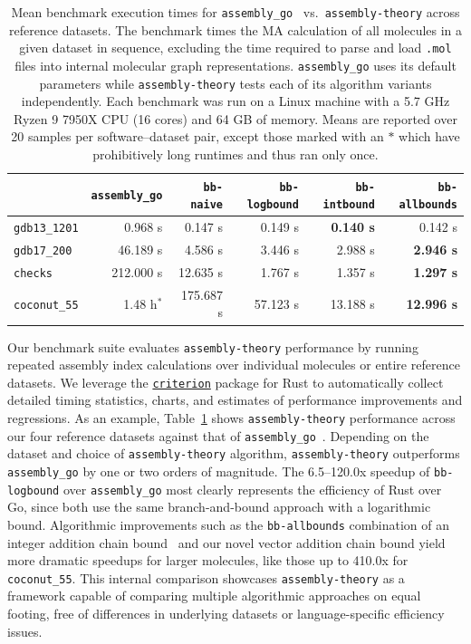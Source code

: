 \documentclass[acmsmall,nonacm,screen]{acmart}  %
\begin{document}
\begin{table}[tbh]
    \centering
    \caption{Mean benchmark execution times for \texttt{assembly\_go}~\cite{Jirasek2024-investigatingquantifying} vs.\ \texttt{assembly-theory} across reference datasets.
    The benchmark times the MA calculation of all molecules in a given dataset in sequence, excluding the time required to parse and load \texttt{.mol} files into internal molecular graph representations.
    \texttt{assembly\_go} uses its default parameters while \texttt{assembly-theory} tests each of its algorithm variants independently.
    Each benchmark was run on a Linux machine with a 5.7 GHz Ryzen 9 7950X CPU (16 cores) and 64 GB of memory.
    Means are reported over 20 samples per software--dataset pair, except those marked with an $\ast$ which have prohibitively long runtimes and thus ran only once.}
    \label{tab:benchtimes}
    \begin{tabular}{lrrrrr}
        \toprule
         & \texttt{assembly\_go} & \texttt{bb-naive} & \texttt{bb-logbound} & \texttt{bb-intbound} & \texttt{bb-allbounds} \\
        \midrule
        \texttt{gdb13\_1201} & 0.968 s & 0.147 s & 0.149 s & \textbf{0.140 s} & 0.142 s \\
        \texttt{gdb17\_200} & 46.189 s & 4.586 s & 3.446 s & 2.988 s & \textbf{2.946 s} \\
        \texttt{checks} & 212.000 s & 12.635 s & 1.767 s & 1.357 s & \textbf{1.297 s} \\
        \texttt{coconut\_55} & 1.48 h$^\ast$ & 175.687 s & 57.123 s & 13.188 s & \textbf{12.996 s} \\
        \bottomrule
    \end{tabular}
\end{table}

Our benchmark suite evaluates \texttt{assembly-theory} performance by running repeated assembly index calculations over individual molecules or entire reference datasets.
We leverage the \href{https://bheisler.github.io/criterion.rs/criterion/}{\texttt{criterion}} package for Rust to automatically collect detailed timing statistics, charts, and estimates of performance improvements and regressions.
As an example, Table~\ref{tab:benchtimes} shows \texttt{assembly-theory} performance across our four reference datasets against that of \texttt{assembly\_go}~\cite{Jirasek2024-investigatingquantifying}.
Depending on the dataset and choice of \texttt{assembly-theory} algorithm, \texttt{assembly-theory} outperforms \texttt{assembly\_go} by one or two orders of magnitude.
The 6.5--120.0x speedup of \texttt{bb-logbound} over \texttt{assembly\_go} most clearly represents the efficiency of Rust over Go, since both use the same branch-and-bound approach with a logarithmic bound.
Algorithmic improvements such as the \texttt{bb-allbounds} combination of an integer addition chain bound~\cite{Seet2024-rapidcomputation} and our novel vector addition chain bound yield more dramatic speedups for larger molecules, like those up to 410.0x for \texttt{coconut\_55}.
This internal comparison showcases \texttt{assembly-theory} as a framework capable of comparing multiple algorithmic approaches on equal footing, free of differences in underlying datasets or language-specific efficiency issues.
\end{document}

